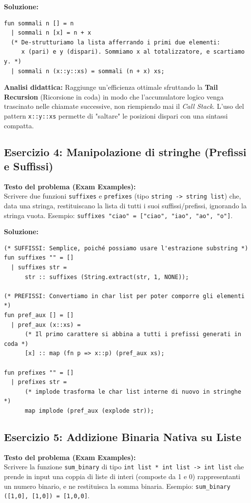 \documentclass[12pt, a4paper]{article}
\begin{document}
\newpage

\textbf{Soluzione:}
\begin{verbatim}
fun sommali n [] = n
  | sommali n [x] = n + x
  (* De-strutturiamo la lista afferrando i primi due elementi: 
     x (pari) e y (dispari). Sommiamo x al totalizzatore, e scartiamo y. *)
  | sommali n (x::y::xs) = sommali (n + x) xs;
\end{verbatim}
\textbf{Analisi didattica:} Raggiunge un'efficienza ottimale sfruttando la \textbf{Tail Recursion} (Ricorsione in coda) in modo che l'accumulatore logico venga trascinato nelle chiamate successive, non riempiendo mai il \textit{Call Stack}. L'uso del pattern \texttt{x::y::xs} permette di "saltare" le posizioni dispari con una sintassi compatta.

\subsection{Esercizio 4: Manipolazione di stringhe (Prefissi e Suffissi)}

\textbf{Testo del problema (Exam Examples):}\\
Scrivere due funzioni \texttt{suffixes} e \texttt{prefixes} (tipo \texttt{string -> string list}) che, data una stringa, restituiscano la lista di tutti i suoi suffissi/prefissi, ignorando la stringa vuota. 
Esempio: \texttt{suffixes "ciao" = ["ciao", "iao", "ao", "o"]}.

\textbf{Soluzione:}
\begin{verbatim}
(* SUFFISSI: Semplice, poiché possiamo usare l'estrazione substring *)
fun suffixes "" = []
  | suffixes str = 
      str :: suffixes (String.extract(str, 1, NONE));

(* PREFISSI: Convertiamo in char list per poter comporre gli elementi *)
fun pref_aux [] = []
  | pref_aux (x::xs) = 
      (* Il primo carattere si abbina a tutti i prefissi generati in coda *)
      [x] :: map (fn p => x::p) (pref_aux xs);

fun prefixes "" = []
  | prefixes str = 
      (* implode trasforma le char list interne di nuovo in stringhe *)
      map implode (pref_aux (explode str));
\end{verbatim}

\subsection{Esercizio 5: Addizione Binaria Nativa su Liste}

\textbf{Testo del problema (Exam Examples):}\\
Scrivere la funzione \texttt{sum\_binary} di tipo \texttt{int list * int list -> int list} che prende in input una coppia di liste di interi (composte da 1 e 0) rappresentanti un numero binario, e ne restituisca la somma binaria.
Esempio: \texttt{sum\_binary ([1,0], [1,0]) = [1,0,0]}.
\end{document}
